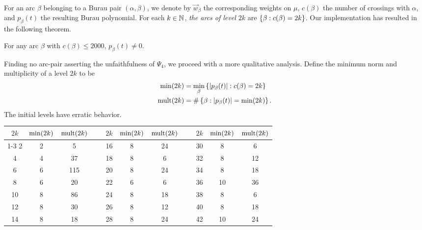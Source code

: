 For an arc $\beta$ belonging to a Burau pair $(\alpha, \beta)$, we denote by $\vec{w}_\beta$ the corresponding weights on $\mu$, $c(\beta)$ the number of crossings with $\alpha$, and $p_\beta(t)$ the resulting Burau polynomial. For each $k \in \mathbb{N}$, \emph{the arcs of level $2k$} are $\left\{\beta : c(\beta) = 2k\right\}$. Our implementation has resulted in the following theorem.

\begin{theorem}
 For any arc $\beta$ with $c(\beta) \leq 2000$, $p_\beta(t) \neq 0$.
\end{theorem}

Finding no arc-pair asserting the unfaithfulness of $\Psi_4$, we proceed with a more qualitative analysis. Define the minimum norm and multiplicity of a level $2k$ to be
\begin{align*}
 \operatorname{min}(2k) &= \min_{\beta} \left\{|p_\beta(t)| : c(\beta) = 2k\right\}\\
 \operatorname{mult}(2k) &= \#\left\{\beta : |p_\beta(t)| = \operatorname{min}(2k)\right\}.
\end{align*}
The initial levels have erratic behavior.
\begin{center}
 \begin{tabular}{c|c|ccc|c|ccc|c|c}
  $2k$ & $\operatorname{min}(2k)$ & $\operatorname{mult}(2k)$ & \  & $2k$ & $\operatorname{min}(2k)$ & $\operatorname{mult}(2k)$ & \  & $2k$ & $\operatorname{min}(2k)$ & $\operatorname{mult}(2k)$\\
  \cline{1-3} \cline{5-7} \cline{9-11}
  2 & 2 & 5 && 16 & 8 & 24 && 30 & 8 & 6\\
  4 & 4 & 37 && 18 & 8 & 6 && 32 & 8 & 12\\
  6 & 6 & 115 && 20 & 8 & 24 && 34 & 8 & 18\\
  8 & 6 & 20 && 22 & 6 & 6 && 36 & 10 & 36\\
  10 & 8 & 86 && 24 & 8 & 18 && 38 & 8 & 6\\
  12 & 8 & 30 && 26 & 8 & 12 && 40 & 8 & 18\\
  14 & 8 & 18 && 28 & 8 & 24 && 42 & 10 & 24\\
 \end{tabular}
\end{center}

